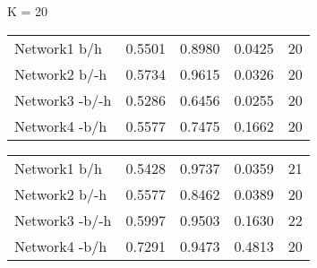 \begin{table*}[h]

	\begin{minipage}[h]{0.45\linewidth} 
K = 20
\begin{tabular}{lrrrr}

 Network1 b/h           &   0.5501 &      0.8980 &   0.0425 & 20 \\
 Network2 b/-h        &   0.5734 &      0.9615 &   0.0326 & 20 \\
 Network3 -b/-h       &   0.5286 &      0.6456 &   0.0255 & 20 \\
 Network4 -b/h         &   0.5577 &      0.7475 &   0.1662 & 20 \\
\hline
\end{tabular}
\end{minipage}
\hspace{0.8cm}
\begin{minipage}[h]{0.45\linewidth}
\begin{tabular}{lrrrr}
 Network1 b/h         &   0.5428 &      0.9737 &   0.0359 &  21 \\
 Network2 b/-h      &   0.5577 &      0.8462 &   0.0389 &  20 \\
 Network3 -b/-h     &   0.5997 &      0.9503 &   0.1630 &  22 \\
 Network4 -b/h      &   0.7291 &      0.9473 &   0.4813 & 20 \\
\hline
\end{tabular}
\end{minipage}
\end{table*}


%
